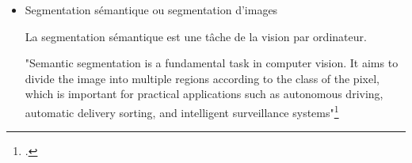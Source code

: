 \begin{itemize}


Qu'est-ce que ça signifie pour l'institution de passer d'un objet-film à une collection de plans ? Quelles sont les implications pour le droit, pour l'accès public, pour la description archivistique ?



la mise en place d'une automatisation de la segmentation permettrait d'homogénéiser l'indexation documentataire : un algorithme segmente les vidéos de la même façon, pas les humains. Mais les vidéos sont toutes différentes : est ce qu'on peut garder la même pratique de segmentation sur des corpus vidéo différents ?

\item Segmentation sémantique ou segmentation d'images
 
 La segmentation sémantique est une tâche de la vision par ordinateur. 
 
"Semantic segmentation is a fundamental task in computer vision. It aims to divide the image into multiple regions according to the class of the pixel, which is important for practical applications such as autonomous driving, automatic delivery sorting, and intelligent surveillance systems"\footcite{yuan2025}


\end{itemize}
